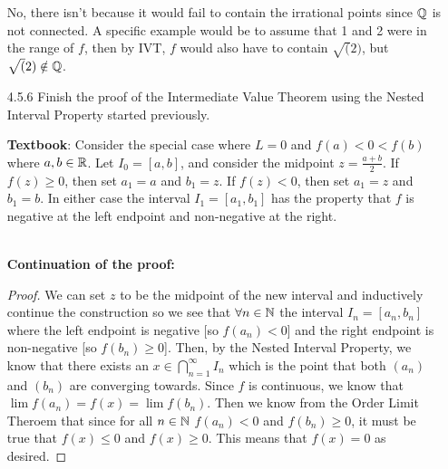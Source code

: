 \documentclass[12pt,letterpaper]{article}
\begin{document}
\begin{itemize}[leftmargin=!,labelindent=5pt]
            No, there isn't because it would fail to contain the irrational points since $\mathbb{Q}$ is not connected. A specific example would be to assume that 1 and 2 were in the range of $f$, then by IVT, $f$ would also have to contain $\sqrt(2)$, but $\sqrt(2) \notin \mathbb{Q}$.
        \item [4.5.6] Finish the proof of the Intermediate Value Theorem using the Nested Interval Property started previously.
        
            \textbf{Textbook}: 
                Consider the special case where $L = 0$ and $f(a) < 0 < f(b)$ where $a,b \in \mathbb{R}$.
                Let $I_0 = [a,b]$, and consider the midpoint $z = \frac{a+b}{2}$.
                If $f(z) \geq 0$, then set $a_1 = a$ and $b_1 = z$. 
                If $f(z) < 0$, then set $a_1 = z$ and $b_1 = b$.
                In either case the interval $I_1 = [a_1, b_1]$ has the property that $f$ is negative at the left endpoint and non-negative at the right.
            
            \ \\
            \textbf{Continuation of the proof:} 
            \begin{proof}
                We can set $z$ to be the midpoint of the new interval and inductively continue the construction so we see that $\forall n \in \mathbb{N}$ the interval $I_n = [a_n, b_n]$ where the left endpoint is negative [so $f(a_n) < 0$] and the right endpoint is non-negative [so $f(b_n) \geq 0$].
                Then, by the Nested Interval Property, we know that there exists an $x \in \bigcap_{n=1}^{\infty}I_n$ which is the point that both $(a_n)$ and $(b_n)$ are converging towards.
                Since $f$ is continuous, we know that $\lim f(a_n) = f(x) = \lim f(b_n)$.
                Then we know from the Order Limit Theroem that since for all $n \in \mathbb{N}$ $f(a_n) < 0$ and $f(b_n) \geq 0$, it must be true that $f(x) \leq 0$ and $f(x) \geq 0$. 
                This means that $f(x) = 0$ as desired.
            \end{proof}
    \end{itemize}
\end{document}
